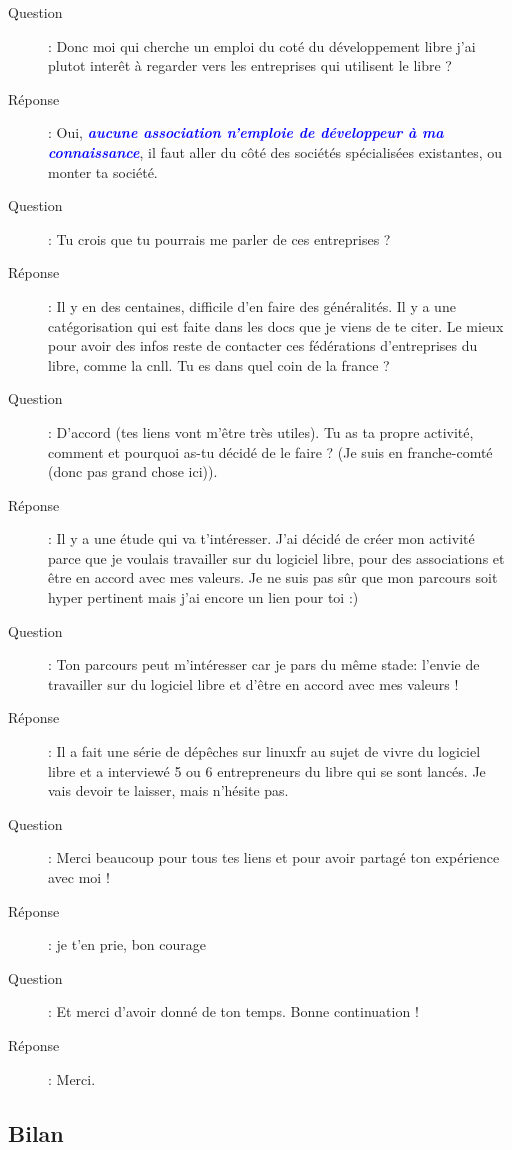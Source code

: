 \documentclass[a4paper,12pt, draft]{report}
\newcommand{\importantPoint}[1]{\textcolor{blue}{\textbf{\textit{#1}}}}
\begin{document}
\begin{description}
\item [Question]:  Donc moi qui cherche un emploi du coté du développement libre j'ai plutot interêt à regarder vers les entreprises qui utilisent le libre ?
\item [Réponse]:  Oui, \importantPoint{aucune association n'emploie de développeur à ma connaissance}, il faut aller du côté des sociétés spécialisées existantes, ou monter ta société.
\item [Question]:  Tu crois que tu pourrais me parler de ces entreprises ?
\item [Réponse]:  Il y en des centaines, difficile d'en faire des généralités. Il y a une catégorisation qui est faite dans les docs que je viens de te citer. Le mieux pour avoir des infos reste de contacter ces fédérations d'entreprises du libre, comme la cnll. Tu es dans quel coin de la france ?
\item [Question]:  D'accord (tes liens vont m'être très utiles). Tu as ta propre activité, comment et  pourquoi as-tu décidé de le faire ? (Je suis en franche-comté (donc pas grand chose ici)).
\item [Réponse]:  Il y a une étude\cite{cnll_etude} qui va t'intéresser. J'ai décidé de créer mon activité parce que je voulais travailler sur du logiciel libre, pour des associations et être en accord avec mes valeurs. Je ne suis pas sûr que mon parcours soit hyper pertinent mais j'ai encore un lien\cite{linuxfr_new} pour toi :)
\item [Question]:  Ton parcours peut m'intéresser car je pars du même stade: l'envie de travailler sur du logiciel libre et d'être en accord avec mes valeurs !
\item [Réponse]:  Il a fait une série de dépêches sur linuxfr au sujet de vivre du logiciel libre et a interviewé 5 ou 6 entrepreneurs du libre qui se sont lancés. Je vais devoir te laisser, mais n'hésite pas.
\item [Question]:  Merci beaucoup pour tous tes liens et pour avoir partagé ton expérience avec moi !
\item [Réponse]:  je t'en prie, bon courage
\item [Question]:  Et merci d'avoir donné de ton temps. Bonne continuation !
\item [Réponse]:  Merci.
\end{description}
\newpage
\subsection{Bilan}
\end{document}
